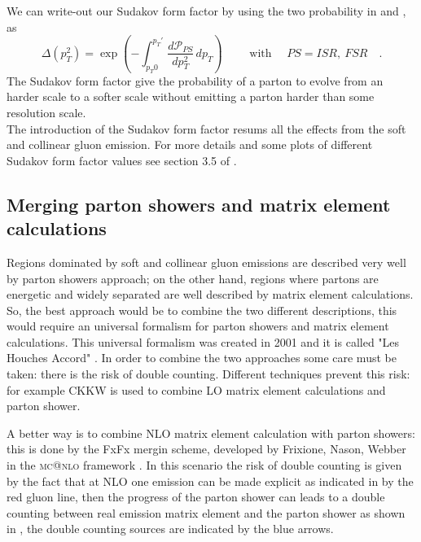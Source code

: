 We can write-out our Sudakov form factor by using the two probability in  and , as
\begin{equation}
	\Delta(p_T^2)=\exp\left( -\displaystyle\int_{p_T0}^{p_T'} \frac{d\mathcal{P}_{PS}}{dp_T^2} \,dp_T\right) \qquad\text{ with } \quad PS=ISR,\ FSR \quad.
	\label{eq:sudakovFormFactor}
\end{equation}
The Sudakov form factor give the probability of a parton to evolve from an harder scale to a softer scale without emitting a parton harder than some resolution scale. 
\\
The introduction of the Sudakov form factor resums all the effects from the soft and collinear gluon emission. For more details and some plots of different Sudakov form factor values see section 3.5 of \cite{Campbell2006}.

\subsection{Merging parton showers and matrix element calculations}

Regions dominated by soft and collinear gluon emissions are described very well by parton showers approach; on the other hand, regions where partons are  energetic and widely separated are well described by matrix element calculations.  
So, the best approach would be to combine the two different descriptions, this would require an universal formalism for parton showers and matrix element calculations. This universal formalism was created in 2001 and it is called "Les Houches Accord" \cite{LesHouchesAccord}.
In order to combine the two approaches some care must be taken: there is the risk of double counting. Different techniques prevent this risk: for example CKKW \cite{CKKW2001} is used to combine LO matrix element calculations and parton shower.


A better way is to combine NLO matrix element calculation with parton showers: this is done by the FxFx mergin scheme, developed by Frixione, Nason, Webber in the \textsc{mc@nlo} framework \cite{FxFx1,FxFx2,FxFx3,FxFx4}. In this scenario the risk of  double counting is given by the fact that at NLO one emission can be made explicit as indicated in  by the red gluon line, then the progress of the parton shower can leads to a double counting between real emission matrix element and the parton shower as shown in , the double counting sources are indicated by the blue arrows.


